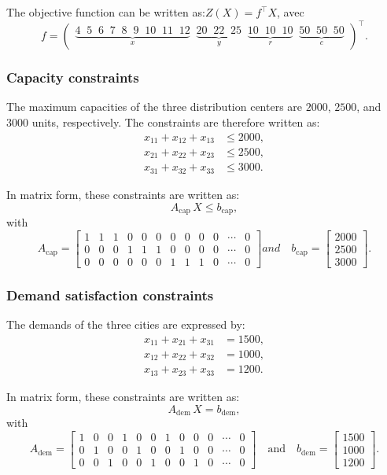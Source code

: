 The objective function can be written as:\(Z(X) = f^{\top} X\), avec
\[
f = \begin{pmatrix}
\underbrace{4 \;\; 5 \;\; 6 \;\; 7 \;\; 8 \;\; 9 \;\; 10 \;\; 11 \;\; 12}_{x}
\;\; \underbrace{20 \;\; 22 \;\; 25}_{y}
\;\; \underbrace{10 \;\; 10 \;\; 10}_{r}
\;\; \underbrace{50 \;\; 50 \;\; 50}_{c}
\end{pmatrix}^{\!\top}.
\]


\subsubsection{Capacity constraints}

The maximum capacities of the three distribution centers are
\(2000\), \(2500\), and \(3000\) units, respectively. The constraints
are therefore written as:
\[
\begin{aligned}
x_{11} + x_{12} + x_{13} &\leq 2000, \\
x_{21} + x_{22} + x_{23} &\leq 2500, \\
x_{31} + x_{32} + x_{33} &\leq 3000.
\end{aligned}
\]

In matrix form, these constraints are written as:
\[
A_{\mathrm{cap}}\, X \leq b_{\mathrm{cap}},
\]
with
\[
A_{\mathrm{cap}} =
\begin{bmatrix}
1 & 1 & 1 & 0 & 0 & 0 & 0 & 0 & 0 & 0 & \cdots & 0 \\
0 & 0 & 0 & 1 & 1 & 1 & 0 & 0 & 0 & 0 & \cdots & 0 \\
0 & 0 & 0 & 0 & 0 & 0 & 1 & 1 & 1 & 0 & \cdots & 0
\end{bmatrix}
 and
\quad
b_{\mathrm{cap}} =
\begin{bmatrix}
2000 \\ 2500 \\ 3000
\end{bmatrix}.
\]

\subsubsection{Demand satisfaction constraints}

The demands of the three cities are expressed by:
\[
\begin{aligned}
x_{11} + x_{21} + x_{31} &= 1500, \\
x_{12} + x_{22} + x_{32} &= 1000, \\
x_{13} + x_{23} + x_{33} &= 1200.
\end{aligned}
\]

In matrix form, these constraints are written as:
\[
A_{\mathrm{dem}}\, X = b_{\mathrm{dem}},
\]
with
\[
A_{\mathrm{dem}}  =
\begin{bmatrix}
1 & 0 & 0 & 1 & 0 & 0 & 1 & 0 & 0 & 0 & \cdots & 0 \\
0 & 1 & 0 & 0 & 1 & 0 & 0 & 1 & 0 & 0 & \cdots & 0 \\
0 & 0 & 1 & 0 & 0 & 1 & 0 & 0 & 1 & 0 & \cdots & 0
\end{bmatrix}
\quad \text{and} \quad
b_{\mathrm{dem}} =
\begin{bmatrix}
1500 \\ 1000 \\ 1200
\end{bmatrix}.
\]

